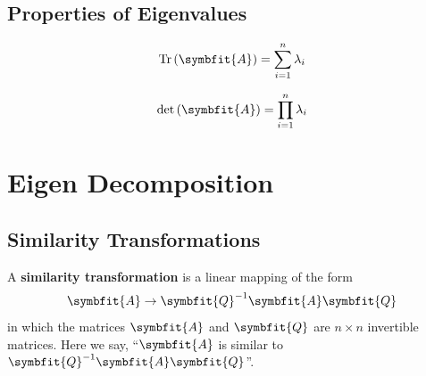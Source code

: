 \documentclass{article}
\begin{document}
\subsection{Properties of Eigenvalues}
\begin{theorem}
    \begin{equation*}
        \tr{\left( \symbfit{A} \right)} = \sum_{i=1}^n \lambda_i
    \end{equation*}
\end{theorem}
\begin{theorem}
    \begin{equation*}
        \det{\left( \symbfit{A} \right)} = \prod_{i=1}^n \lambda_i
    \end{equation*}
\end{theorem}
\newpage
\section{Eigen Decomposition}
\subsection{Similarity Transformations}
\begin{definition}
    A \textbf{similarity transformation} is a linear mapping of the form
    \begin{equation*}
        \symbfit{A}\rightarrow \symbfit{Q}^{-1}\symbfit{A}\symbfit{Q}
    \end{equation*}
    in which the matrices \(\symbfit{A}\) and \(\symbfit{Q}\) are
    \(n \times n\) invertible matrices. Here we say, ``\(\symbfit{A}\)
    is similar to \(\symbfit{Q}^{-1}\symbfit{A}\symbfit{Q}\)''.
\end{definition}
\end{document}
